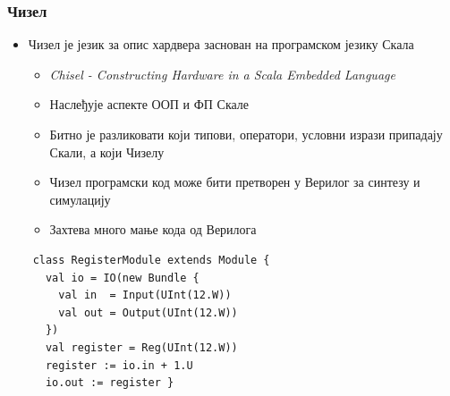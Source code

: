 \begin{frame}[fragile]
\frametitle{Чизел}
 \begin{itemize}
  \item \alert{Чизел} је језик за опис хардвера заснован на програмском језику Скала %
  \begin{itemize}
   \item \textit{Chisel - Constructing Hardware in a Scala Embedded Language}
   \item Наслеђује аспекте ООП и ФП Скале
   \item Битно је разликовати који типови, оператори, условни изрази припадају Скали, а који Чизелу
   \item Чизел програмски код може бити претворен у Верилог за синтезу и симулацију
   \item Захтева много мање кода од Верилога
  \end{itemize}
 \end{itemize}
 \begin{verbatim}
    class RegisterModule extends Module {
      val io = IO(new Bundle {
        val in  = Input(UInt(12.W))
        val out = Output(UInt(12.W))
      })
      val register = Reg(UInt(12.W))
      register := io.in + 1.U
      io.out := register }
\end{verbatim}
\end{frame}


